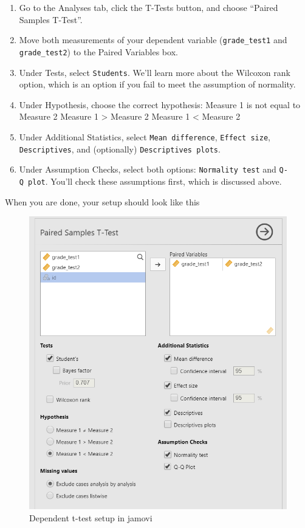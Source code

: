 \documentclass[
]{book}
\begin{document}
\begin{enumerate}
\def\labelenumi{\arabic{enumi}.}
\item
  Go to the Analyses tab, click the T-Tests button, and choose ``Paired Samples T-Test''.
\item
  Move both measurements of your dependent variable (\texttt{grade\_test1} and \texttt{grade\_test2}) to the Paired Variables box.
\item
  Under Tests, select \texttt{Student\textquotesingle{}s}. We'll learn more about the Wilcoxon rank option, which is an option if you fail to meet the assumption of normality.
\item
  Under Hypothesis, choose the correct hypothesis: Measure 1 is not equal to Measure 2 Measure 1 \textgreater{} Measure 2 Measure 1 \textless{} Measure 2
\item
  Under Additional Statistics, select \texttt{Mean\ difference}, \texttt{Effect\ size}, \texttt{Descriptives}, and (optionally) \texttt{Descriptives\ plots}.
\item
  Under Assumption Checks, select both options: \texttt{Normality\ test} and \texttt{Q-Q\ plot}. You'll check these assumptions first, which is discussed above.
\end{enumerate}

When you are done, your setup should look like this

\begin{figure}

{\centering \includegraphics[width=0.8\linewidth]{images/03_dependent_t-test/dependent_setup} 

}

\caption{Dependent t-test setup in jamovi}\label{fig:unnamed-chunk-6}
\end{figure}
\end{document}
